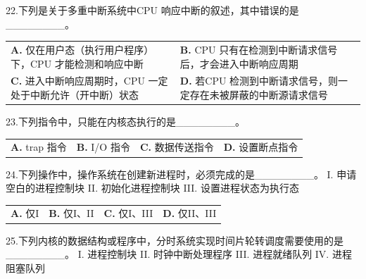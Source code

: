 \documentclass[UTF8,11pt]{ctexart}
\begin{document}
22.下列是关于多重中断系统中CPU 响应中断的叙述，其中错误的是\_\_\_\_\_\_\_\_。


\begin{center}\begin{tabular}{>{\raggedright\arraybackslash}p{\dimexpr(\linewidth-4\tabcolsep)/2\relax}>{\raggedright\arraybackslash}p{\dimexpr(\linewidth-4\tabcolsep)/2\relax}}
\textbf{A.} 仅在用户态（执行用户程序）下，CPU 才能检测和响应中断 & \textbf{B.} CPU 只有在检测到中断请求信号后，才会进入中断响应周期\\[.35em]
\textbf{C.} 进入中断响应周期时，CPU 一定处于中断允许（开中断）状态 & \textbf{D.} 若CPU 检测到中断请求信号，则一定存在未被屏蔽的中断源请求信号\\[.35em]\end{tabular}\end{center}

23.下列指令中，只能在内核态执行的是\_\_\_\_\_\_\_\_。


\begin{center}\begin{tabular}{>{\raggedright\arraybackslash}p{\dimexpr(\linewidth-8\tabcolsep)/4\relax}>{\raggedright\arraybackslash}p{\dimexpr(\linewidth-8\tabcolsep)/4\relax}>{\raggedright\arraybackslash}p{\dimexpr(\linewidth-8\tabcolsep)/4\relax}>{\raggedright\arraybackslash}p{\dimexpr(\linewidth-8\tabcolsep)/4\relax}}
\textbf{A.} trap 指令 & \textbf{B.} I/O 指令 & \textbf{C.} 数据传送指令 & \textbf{D.} 设置断点指令\\[.35em]\end{tabular}\end{center}

24.下列操作中，操作系统在创建新进程时，必须完成的是\_\_\_\_\_\_\_\_。 I. 申请空白的进程控制块 II. 初始化进程控制块 III. 设置进程状态为执行态


\begin{center}\begin{tabular}{>{\raggedright\arraybackslash}p{\dimexpr(\linewidth-8\tabcolsep)/4\relax}>{\raggedright\arraybackslash}p{\dimexpr(\linewidth-8\tabcolsep)/4\relax}>{\raggedright\arraybackslash}p{\dimexpr(\linewidth-8\tabcolsep)/4\relax}>{\raggedright\arraybackslash}p{\dimexpr(\linewidth-8\tabcolsep)/4\relax}}
\textbf{A.} 仅I & \textbf{B.} 仅I、II & \textbf{C.} 仅I、III & \textbf{D.} 仅II、III\\[.35em]\end{tabular}\end{center}

25.下列内核的数据结构或程序中，分时系统实现时间片轮转调度需要使用的是\_\_\_\_\_\_\_\_。 I. 进程控制块 II. 时钟中断处理程序 III. 进程就绪队列 IV. 进程阻塞队列
\end{document}
